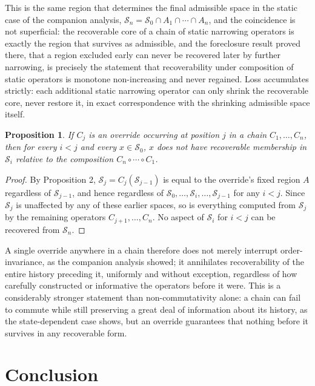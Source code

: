 \documentclass[11pt]{article}
\newtheorem{proposition}{Proposition}
\begin{document}
This is the same region that determines the final admissible space in the static case of the companion analysis, $\mathcal{S}_n = \mathcal{S}_0 \cap A_1 \cap \cdots \cap A_n$, and the coincidence is not superficial: the recoverable core of a chain of static narrowing operators is exactly the region that survives as admissible, and the foreclosure result proved there, that a region excluded early can never be recovered later by further narrowing, is precisely the statement that recoverability under composition of static operators is monotone non-increasing and never regained. Loss accumulates strictly: each additional static narrowing operator can only shrink the recoverable core, never restore it, in exact correspondence with the shrinking admissible space itself.

\begin{proposition}
If $C_j$ is an override occurring at position $j$ in a chain $C_1, \ldots, C_n$, then for every $i < j$ and every $x \in \mathcal{S}_0$, $x$ does not have recoverable membership in $\mathcal{S}_i$ relative to the composition $C_n \circ \cdots \circ C_1$.
\end{proposition}

\begin{proof}
By Proposition 2, $\mathcal{S}_j = C_j(\mathcal{S}_{j-1})$ is equal to the override's fixed region $A$ regardless of $\mathcal{S}_{j-1}$, and hence regardless of $\mathcal{S}_0, \ldots, \mathcal{S}_{i}, \ldots, \mathcal{S}_{j-1}$ for any $i < j$. Since $\mathcal{S}_j$ is unaffected by any of these earlier spaces, so is everything computed from $\mathcal{S}_j$ by the remaining operators $C_{j+1}, \ldots, C_n$. No aspect of $\mathcal{S}_i$ for $i < j$ can be recovered from $\mathcal{S}_n$.
\end{proof}

A single override anywhere in a chain therefore does not merely interrupt order-invariance, as the companion analysis showed; it annihilates recoverability of the entire history preceding it, uniformly and without exception, regardless of how carefully constructed or informative the operators before it were. This is a considerably stronger statement than non-commutativity alone: a chain can fail to commute while still preserving a great deal of information about its history, as the state-dependent case shows, but an override guarantees that nothing before it survives in any recoverable form.

\section{Conclusion}
\end{document}
